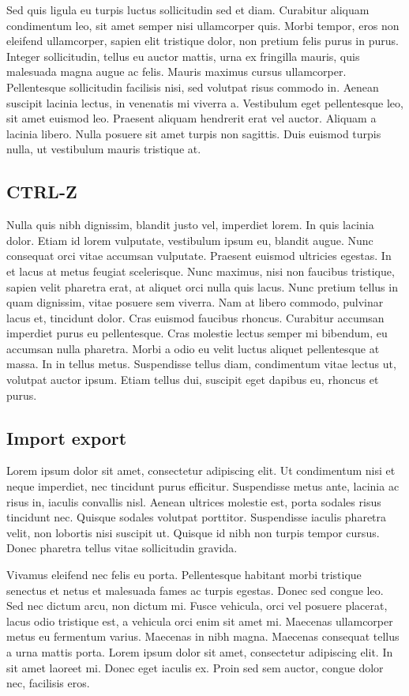 		Sed quis ligula eu turpis luctus sollicitudin sed et diam. Curabitur aliquam condimentum leo, sit amet semper nisi ullamcorper quis. Morbi tempor, eros non eleifend ullamcorper, sapien elit tristique dolor, non pretium felis purus in purus. Integer sollicitudin, tellus eu auctor mattis, urna ex fringilla mauris, quis malesuada magna augue ac felis. Mauris maximus cursus ullamcorper. Pellentesque sollicitudin facilisis nisi, sed volutpat risus commodo in. Aenean suscipit lacinia lectus, in venenatis mi viverra a. Vestibulum eget pellentesque leo, sit amet euismod leo. Praesent aliquam hendrerit erat vel auctor. Aliquam a lacinia libero. Nulla posuere sit amet turpis non sagittis. Duis euismod turpis nulla, ut vestibulum mauris tristique at. 

	\subsection{CTRL-Z}
		 Nulla quis nibh dignissim, blandit justo vel, imperdiet lorem. In quis lacinia dolor. Etiam id lorem vulputate, vestibulum ipsum eu, blandit augue. Nunc consequat orci vitae accumsan vulputate. Praesent euismod ultricies egestas. In et lacus at metus feugiat scelerisque. Nunc maximus, nisi non faucibus tristique, sapien velit pharetra erat, at aliquet orci nulla quis lacus. Nunc pretium tellus in quam dignissim, vitae posuere sem viverra. Nam at libero commodo, pulvinar lacus et, tincidunt dolor. Cras euismod faucibus rhoncus. Curabitur accumsan imperdiet purus eu pellentesque. Cras molestie lectus semper mi bibendum, eu accumsan nulla pharetra. Morbi a odio eu velit luctus aliquet pellentesque at massa. In in tellus metus. Suspendisse tellus diam, condimentum vitae lectus ut, volutpat auctor ipsum. Etiam tellus dui, suscipit eget dapibus eu, rhoncus et purus. 

	\subsection{Import export}
		Lorem ipsum dolor sit amet, consectetur adipiscing elit. Ut condimentum nisi et neque imperdiet, nec tincidunt purus efficitur. Suspendisse metus ante, lacinia ac risus in, iaculis convallis nisl. Aenean ultrices molestie est, porta sodales risus tincidunt nec. Quisque sodales volutpat porttitor. Suspendisse iaculis pharetra velit, non lobortis nisi suscipit ut. Quisque id nibh non turpis tempor cursus. Donec pharetra tellus vitae sollicitudin gravida.

		Vivamus eleifend nec felis eu porta. Pellentesque habitant morbi tristique senectus et netus et malesuada fames ac turpis egestas. Donec sed congue leo. Sed nec dictum arcu, non dictum mi. Fusce vehicula, orci vel posuere placerat, lacus odio tristique est, a vehicula orci enim sit amet mi. Maecenas ullamcorper metus eu fermentum varius. Maecenas in nibh magna. Maecenas consequat tellus a urna mattis porta. Lorem ipsum dolor sit amet, consectetur adipiscing elit. In sit amet laoreet mi. Donec eget iaculis ex. Proin sed sem auctor, congue dolor nec, facilisis eros. 

